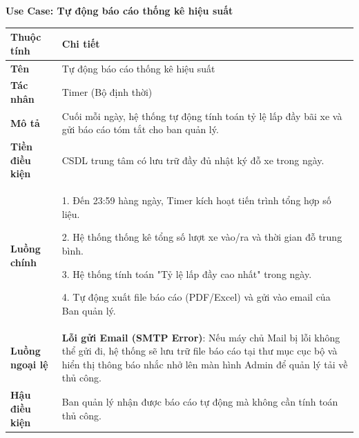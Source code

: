 \noindent \textbf{Use Case: Tự động báo cáo thống kê hiệu suất} \\
\renewcommand{\arraystretch}{1.6}
\begin{xltabular}{\textwidth}{|l|X|}
\hline
\textbf{Thuộc tính} & \textbf{Chi tiết} \\
\hline
\textbf{Tên} & Tự động báo cáo thống kê hiệu suất \\
\hline
\textbf{Tác nhân} & Timer (Bộ định thời) \\
\hline
\textbf{Mô tả} & Cuối mỗi ngày, hệ thống tự động tính toán tỷ lệ lấp đầy bãi xe và gửi báo cáo tóm tắt cho ban quản lý. \\
\hline
\textbf{Tiền điều kiện} & CSDL trung tâm có lưu trữ đầy đủ nhật ký đỗ xe trong ngày. \\
\hline
\textbf{Luồng chính} & 
1. Đến 23:59 hàng ngày, Timer kích hoạt tiến trình tổng hợp số liệu.

2. Hệ thống thống kê tổng số lượt xe vào/ra và thời gian đỗ trung bình.

3. Hệ thống tính toán "Tỷ lệ lấp đầy cao nhất" trong ngày.

4. Tự động xuất file báo cáo (PDF/Excel) và gửi vào email của Ban quản lý.
\\
\hline

\textbf{Luồng ngoại lệ} & 
\textbf{Lỗi gửi Email (SMTP Error)}: Nếu máy chủ Mail bị lỗi không thể gửi đi, hệ thống sẽ lưu trữ file báo cáo tại thư mục cục bộ và hiển thị thông báo nhắc nhở lên màn hình Admin để quản lý tải về thủ công.
\\
\hline

\textbf{Hậu điều kiện} & Ban quản lý nhận được báo cáo tự động mà không cần tính toán thủ công.\\
\hline
\end{xltabular}

